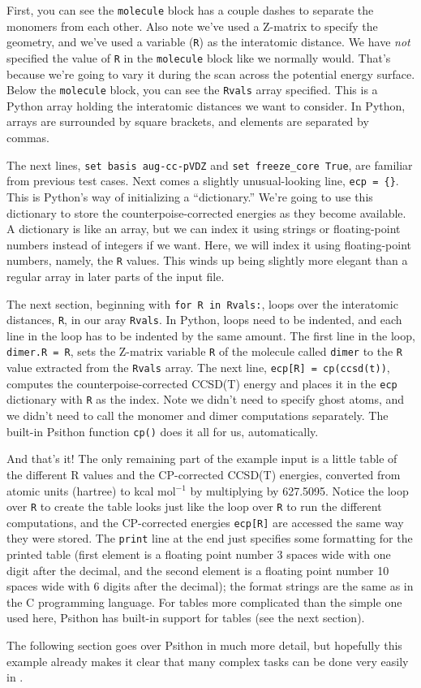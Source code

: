 First, you can see the {\tt molecule} block has a couple dashes to
separate the monomers from each other.  Also note we've used a Z-matrix to
specify the geometry, and we've used a variable ({\tt R}) as the
interatomic distance.  We have {\em not} specified the value of {\tt R} in
the {\tt molecule} block like we normally would.  That's because we're
going to vary it during the scan across the potential energy surface.
Below the {\tt molecule} block, you can see the {\tt Rvals} array
specified.  This is a Python array holding the interatomic distances we
want to consider.  In Python, arrays are surrounded by square brackets, and
elements are separated by commas.

The next lines, {\tt set basis aug-cc-pVDZ} and {\tt set freeze\_core
True}, are familiar from previous test cases.  Next comes a slightly
unusual-looking line, {\tt ecp = \{\}}.  This is Python's way of initializing
a ``dictionary.''  We're going to use this dictionary to store the
counterpoise-corrected energies as they become available.  A dictionary is
like an array, but we can index it using strings or floating-point numbers
instead of integers if we want.  Here, we will index it using
floating-point numbers, namely, the {\tt R} values.  This winds up being
slightly more elegant than a regular array in later parts of the input
file.

The next section, beginning with {\tt for R in Rvals:}, loops over the
interatomic distances, {\tt R}, in our aray {\tt Rvals}.  In Python,
loops need to be indented, and each line in the loop has to be indented
by the same amount.  The first line in the loop, {\tt dimer.R = R},
sets the Z-matrix variable {\tt R} of the molecule called {\tt dimer}
to the {\tt R} value extracted from the {\tt Rvals} array.  The next line,
{\tt ecp[R] = cp(\textquotesingle ccsd(t)\textquotesingle)}, computes the counterpoise-corrected
CCSD(T) energy and places it in the {\tt ecp} dictionary with {\tt R} as
the index.  Note we didn't need to specify ghost atoms, and we didn't need
to call the monomer and dimer computations separately.  The built-in
Psithon function {\tt cp()} does it all for us, automatically.

And that's it!  The only remaining part of the example input is a little
table of the different R values and the CP-corrected CCSD(T) energies,
converted from atomic units (hartree) to kcal mol$^{-1}$ by multiplying by 
627.5095.  Notice
the loop over {\tt R} to create the table looks just like the loop over
{\tt R} to run the different computations, and the CP-corrected energies 
{\tt ecp[R]} are accessed the same way they were stored.  The {\tt print}
line at the end just specifies some formatting for the printed table (first
element is a floating point number 3 spaces wide with one digit after the
decimal, and the second element is a floating point number 10 spaces wide
with 6 digits after the decimal); the format strings are the same as in the
C programming language.  For tables more complicated than the simple one
used here, Psithon has built-in support for tables (see the next section).

The following section goes over Psithon in much more detail, but
hopefully this example already makes it clear that many complex tasks
can be done very easily in \PSIfour.

